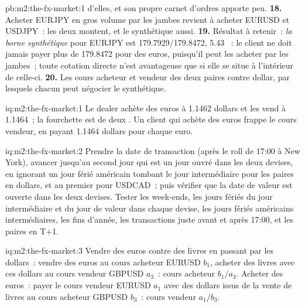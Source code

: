 \begin{solution}{pb:m2:the-fx-market:1}
d'elles, et son propre carnet d'ordres apporte peu.
\textbf{18.} Acheter EURJPY en gros volume par les jambes revient à acheter EURUSD et USDJPY~:
les deux montent, et le  synthétique aussi.
\textbf{19.} Résultat à retenir~: \emph{la borne synthétique} pour EURJPY est
179.7929/179.8472, 5.43 ~: le client ne doit jamais payer plus de 179.8472 pour
des euros, puisqu'il peut les acheter par les jambes~; toute cotation directe n'est avantageuse que si
elle se situe à l'intérieur de celle-ci.
\textbf{20.} Les cours acheteur et vendeur des deux paires contre dollar, par lesquels chacun peut
négocier le  synthétique.
\end{solution}

\begin{solution}{iq:m2:the-fx-market:1}
Le dealer achète des euros à 1.1462 dollars et les vend à 1.1464~; la fourchette est de
deux . Un client qui achète des euros frappe le cours vendeur, en payant 1.1464 dollars pour chaque
euro.
\end{solution}

\begin{solution}{iq:m2:the-fx-market:2}
Prendre la date de transaction (après le roll de 17:00 à New York), avancer jusqu'au second jour qui
est un jour ouvré dans les deux devises, en ignorant un jour férié américain tombant le jour
intermédiaire pour les paires en dollars, et au premier pour USDCAD~; puis vérifier que la date de valeur est
ouverte dans les deux devises. Tester les week-ends, les jours fériés du jour intermédiaire et du jour de valeur
dans chaque devise, les jours fériés américains intermédiaires, les fins d'année, les transactions juste avant et
après 17:00, et les paires en T+1.
\end{solution}

\begin{solution}{iq:m2:the-fx-market:3}
Vendre des euros contre des livres en passant par les dollars~: vendre des euros au cours acheteur EURUSD $b_1$,
acheter des livres avec ces dollars au cours vendeur GBPUSD $a_3$~: cours acheteur $b_1/a_3$. Acheter
des euros~: payer le cours vendeur EURUSD $a_1$ avec des dollars issus de la vente de livres au
cours acheteur GBPUSD $b_3$~: cours vendeur $a_1/b_3$.
\end{solution}

